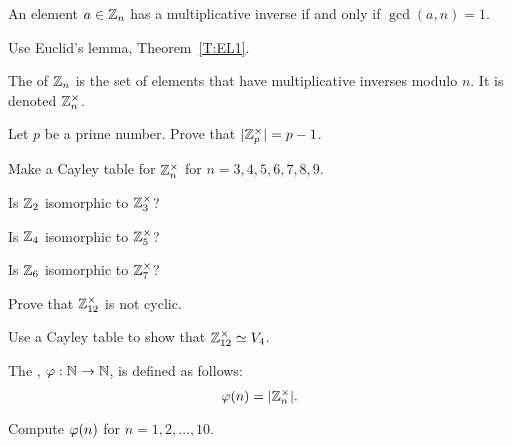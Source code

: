 \documentclass{ximera}
\begin{document}
\begin{lemma}
  An element $a\in\mathbb Z_n$ has a multiplicative inverse if and only if
  $\gcd(a,n) = 1$.
  \begin{sketch}
    Use Euclid's lemma, Theorem~\ref{T:EL1}.
  \end{sketch}
\end{lemma}

\begin{definition}
  The  of $\mathbb Z_n$ is the set of elements that
  have multiplicative inverses modulo $n$. It is denoted
  $\mathbb Z_n^\times$.
\end{definition}


\begin{exercise}
  Let $p$ be a prime number. Prove that $|\mathbb Z_p^\times| = p-1$.
\end{exercise}


\begin{exercise}
  Make a Cayley table for $\mathbb Z_n^\times$ for $n = 3,4,5,6,7,8,9$.
\end{exercise}

\begin{exercise}
  Is $\mathbb Z_2$ isomorphic to $\mathbb Z_3^\times$?
\end{exercise}


\begin{exercise}
  Is $\mathbb Z_4$ isomorphic to $\mathbb Z_5^\times$?
\end{exercise}

\begin{exercise}
  Is $\mathbb Z_6$ isomorphic to $\mathbb Z_7^\times$?
\end{exercise}


\begin{exercise}
  Prove that $\mathbb Z_{12}^\times$ is not cyclic.
\end{exercise}

\begin{exercise}
  Use a Cayley table to show that $\mathbb Z^\times_{12}\simeq V_4$.
\end{exercise}


\begin{definition}
  The , $\eulerphi:\N\to\N$, is defined as
  follows:
  \[
  \eulerphi(n) = |\Z_n^\times|.
  \]
\end{definition}


\begin{exercise}
  Compute $\eulerphi(n)$ for $n = 1,2,\dots, 10$.
\end{exercise}
\end{document}
